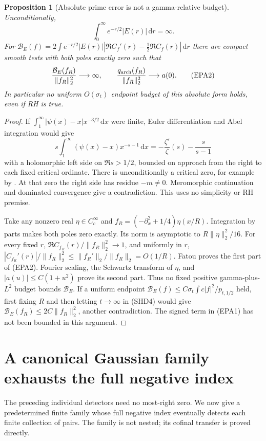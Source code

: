 \documentclass[11pt]{article}
\newtheorem{proposition}[theorem]{Proposition}
\theoremstyle{remark}\newtheorem{remark}[theorem]{Remark}
\newcommand{\dd}{\,\mathrm d}
\begin{document}
\begin{proposition}[Absolute prime error is not a gamma-relative budget]
\label{prop:absolute-prime-error-obstruction}
Unconditionally,
\[
 \int_0^\infty e^{-r/2}|E(r)|\dd r=\infty .
\]
For
$\mathcal B_E(f)=2\int e^{-r/2}|E(r)|
                   |\Re C_f'(r)-\tfrac12\Re C_f(r)|\dd r$
there are compact smooth tests with both poles exactly zero
such that
\[
 \frac{\mathcal B_E(f_R)}{\|f_R\|_2^2}\longrightarrow\infty,
 \qquad
 \frac{q_{\rm arch}(f_R)}{\|f_R\|_2^2}\longrightarrow a(0).
                                                        \tag{EPA2}
\]
In particular no uniform $O(\sigma_t)$ endpoint budget
of this absolute form holds, even if RH is true.
\end{proposition}
\begin{proof}
If $\int_1^\infty|\psi(x)-x|x^{-3/2}\dd x$ were finite,
Euler differentiation and Abel integration would give
\[
 s\int_1^\infty(\psi(x)-x)x^{-s-1}\dd x
       =-\frac{\zeta'}{\zeta}(s)-\frac{s}{s-1}
\]
with a holomorphic left side on $\Re s>1/2$, bounded on
approach from the right to each fixed critical ordinate.
There is unconditionally a critical zero, for example
by \cite[Theorem~1, p.~4]{Conrey}.
At that zero the right side has residue $-m\ne0$.
Meromorphic continuation and dominated convergence give
a contradiction. This uses no simplicity or RH premise.

Take any nonzero real $\eta\in C_c^\infty$ and
$f_R=(-\partial_x^2+1/4)\eta(x/R)$.
Integration by parts makes both poles zero exactly.
Its norm is asymptotic to $R\|\eta\|_2^2/16$.
For every fixed $r$, $\Re C_{f_R}(r)/\|f_R\|_2^2\to1$,
and uniformly in $r$,
$|C_{f_R}'(r)|/\|f_R\|_2^2\le\|f_R'\|_2/\|f_R\|_2=O(1/R)$.
Fatou proves the first part of (EPA2).
Fourier scaling, the Schwartz transform of $\eta$, and
$|a(u)|\le C(1+u^2)$ prove its second part.
Thus no fixed positive gamma-plus-$L^2$ budget bounds
$\mathcal B_E$. If a uniform endpoint
$\mathcal B_E(f)\le C\sigma_t\int c|f|^2/p_{t,1/2}$
held, first fixing $R$ and then letting $t\to\infty$
in (SHD4) would give
$\mathcal B_E(f_R)\le2C\|f_R\|_2^2$, another contradiction.
The signed term in (EPA1) has not been bounded in this argument.
\end{proof}

\section{A canonical Gaussian family exhausts the full negative index}
The preceding individual detectors need no most-right zero.
We now give a predetermined finite family whose full negative
index eventually detects each finite collection of pairs.
The family is not nested; its cofinal transfer is proved directly.
\end{document}
